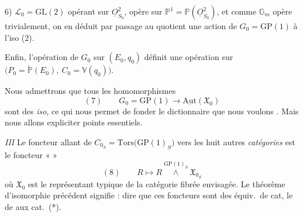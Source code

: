 \documentclass[11pt,a4paper]{article}
\begin{document}
6) $\mathcal{L}_0 = \mathrm{GL}(2)$ opérant sur $\underline{O}^2_{S_0}$, opère sur
$\mathbb{P}^1 = \mathbb{P}(\underline{O}^2_{S_0})$, et comme $\mathbb{G}_m$ opère
trivialement, on en déduit par passage au quotient une action de
$G_0 = \mathrm{GP}(1)$  à l'iso (2).

Enfin, l'opération de $G_0$ sur $(E_0, q_0)$ définit une opération sur
$\bigl(P_0 = \check{\mathbb{P}}(E_0),\ C_0 = \mathbb{V}(q_0)\bigr)$.

Nous admettrons  que tous les
homomorphismes
\[
  (7) \qquad G_0 = \mathrm{GP}(1) \longrightarrow \underline{\mathrm{Aut}}(\mathfrak{X}_0)
\]
sont des \emph{iso}, ce qui nous permet de fonder le dictionnaire que nous voulons
.
Mais nous allons \struck{\ill{}} expliciter  points essentiels.

\emph{III} Le foncteur allant de $C_{0_S} = \mathrm{Tors}\bigl(\mathrm{GP}(1)_S\bigr)$
vers les huit autres \emph{catégories} est le foncteur «  »
\[
  (8) \qquad R \longmapsto R \overset{\mathrm{GP}(1)_S}{\wedge} \mathfrak{X}_{0_S}
\]
où $\mathfrak{X}_0$ est le représentant typique  de la
catégorie fibrée envisagée. Le théorème d'isomorphie précédent signifie : dire que
ces foncteurs sont des équiv.\ de cat, \ill{} le  de \ill{}
 aux cat.\ (*).
\end{document}
